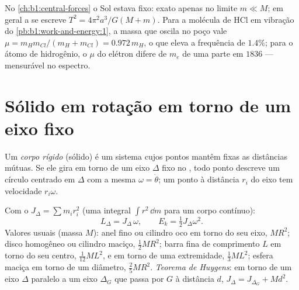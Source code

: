 \begin{example}\label{ex:b1:systems-of-points:reduced}
No \cref{ch:b1:central-forces} o Sol estava fixo: exato apenas no
limite $m \ll M$; em geral a  se escreve $T^2 = 4\pi^2a^3/G(M +
m)$. Para a molécula de HCl em vibração do \cref{pb:b1:work-and-energy:1},
a massa que oscila no poço vale $\mu = m_Hm_{Cl}/(m_H + m_{Cl}) =
0.972\,m_H$, o que eleva a frequência de $1.4\%$; para o átomo de
hidrogênio, o $\mu$ do elétron difere de $m_e$ de uma parte em $1836$ ---
mensurável no espectro.
\end{example}

\section{Sólido em rotação em torno de um eixo fixo}

\begin{definition}\label{def:b1:systems-of-points:solid}
Um \emph{corpo rígido} (sólido) é um sistema cujos pontos mantêm fixas as
distâncias mútuas. Se ele gira em torno de um eixo $\Delta$ fixo no
, todo ponto descreve um círculo centrado em $\Delta$ com a mesma
 $\omega = \dot\theta$; um ponto à distância $r_i$ do eixo
tem velocidade $r_i\omega$.
\end{definition}

\begin{proposition}\label{prop:b1:systems-of-points:inertia}
Com o \emph{} $J_\Delta = \sum m_ir_i^2$ (uma integral
$\int r^2\,\dd m$ para um corpo contínuo):
\[
L_\Delta = J_\Delta\,\omega, \qquad E_k = \tfrac12 J_\Delta\omega^2 .
\]
Valores usuais (massa $M$): anel fino ou cilindro oco em torno do seu eixo,
$MR^2$; disco homogêneo ou cilindro maciço, $\tfrac12 MR^2$; barra fina de
comprimento $L$ em torno do seu centro, $\tfrac{1}{12}ML^2$, e em torno de uma
extremidade, $\tfrac13 ML^2$; esfera maciça em torno de um diâmetro, $\tfrac25 MR^2$.
\emph{Teorema de Huygens}: em torno de um eixo $\Delta$ paralelo a um eixo
$\Delta_G$ que passa por $G$ à distância $d$, $J_\Delta = J_{\Delta_G} + Md^2$.
\end{proposition}

